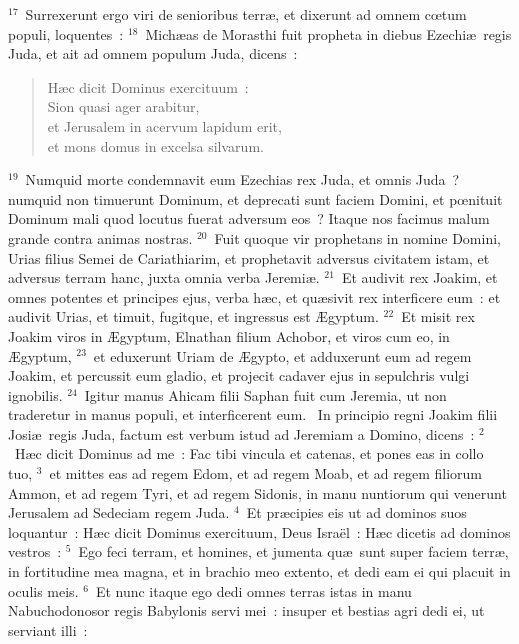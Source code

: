 ${}^{17}$~Surrexerunt ergo viri de senioribus terr\ae , et dixerunt ad omnem cœtum populi, loquentes~:
${}^{18}$~Mich\ae as de Morasthi fuit propheta in diebus Ezechi\ae\ regis Juda, et ait ad omnem populum Juda, dicens~: \begin{flushleft}\begin{verse}H\ae c dicit Dominus exercituum~:\\ Sion quasi ager arabitur,\\ et Jerusalem in acervum lapidum erit,\\ et mons domus in excelsa silvarum.\end{verse}\end{flushleft}


${}^{19}$~Numquid morte condemnavit eum Ezechias rex Juda, et omnis Juda~? numquid non timuerunt Dominum, et deprecati sunt faciem Domini, et pœnituit Dominum mali quod locutus fuerat adversum eos~? Itaque nos facimus malum grande contra animas nostras.
${}^{20}$~Fuit quoque vir prophetans in nomine Domini, Urias filius Semei de Cariathiarim, et prophetavit adversus civitatem istam, et adversus terram hanc, juxta omnia verba Jeremi\ae .
${}^{21}$~Et audivit rex Joakim, et omnes potentes et principes ejus, verba h\ae c, et qu\ae sivit rex interficere eum~: et audivit Urias, et timuit, fugitque, et ingressus est \AE gyptum.
${}^{22}$~Et misit rex Joakim viros in \AE gyptum, Elnathan filium Achobor, et viros cum eo, in \AE gyptum,
${}^{23}$~et eduxerunt Uriam de \AE gypto, et adduxerunt eum ad regem Joakim, et percussit eum gladio, et projecit cadaver ejus in sepulchris vulgi ignobilis.
${}^{24}$~Igitur manus Ahicam filii Saphan fuit cum Jeremia, ut non traderetur in manus populi, et interficerent eum.
~\lettrine[lines=10,image=true,loversize=0.05,lraise=-0.03]{I}{}n principio regni Joakim filii Josi\ae\ regis Juda, factum est verbum istud ad Jeremiam a Domino, dicens~:
${}^{2}$~H\ae c dicit Dominus ad me~: Fac tibi vincula et catenas, et pones eas in collo tuo,
${}^{3}$~et mittes eas ad regem Edom, et ad regem Moab, et ad regem filiorum Ammon, et ad regem Tyri, et ad regem Sidonis, in manu nuntiorum qui venerunt Jerusalem ad Sedeciam regem Juda.
${}^{4}$~Et pr\ae cipies eis ut ad dominos suos loquantur~: H\ae c dicit Dominus exercituum, Deus Isra\"el~: H\ae c dicetis ad dominos vestros~:
${}^{5}$~Ego feci terram, et homines, et jumenta qu\ae\ sunt super faciem terr\ae , in fortitudine mea magna, et in brachio meo extento, et dedi eam ei qui placuit in oculis meis.
${}^{6}$~Et nunc itaque ego dedi omnes terras istas in manu Nabuchodonosor regis Babylonis servi mei~: insuper et bestias agri dedi ei, ut serviant illi~:
